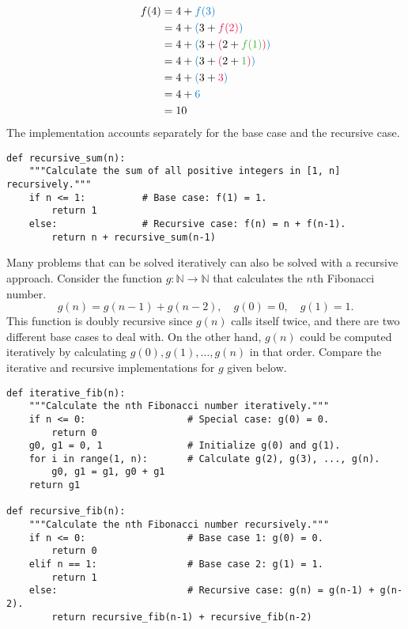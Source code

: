 \begin{align*}
f(4) &= 4 + \textcolor{blue}{f(3)}\\
     &= 4 + \textcolor{blue}{(}3 + \textcolor{red}{f(2)}\textcolor{blue}{)}\\
     &= 4 + \textcolor{blue}{(}3 + \textcolor{red}{(}2 + \textcolor{green}{f(1)}\textcolor{red}{)}\textcolor{blue}{)}\\
     &= 4 + \textcolor{blue}{(}3 + \textcolor{red}{(}2 + \textcolor{green}{1}\textcolor{red}{)}\textcolor{blue}{)} \\%
     &= 4 + \textcolor{blue}{(}3 + \textcolor{red}{3}\textcolor{blue}{)}\\
     &= 4 + \textcolor{blue}{6}\\
     &= 10
\end{align*}
The implementation accounts separately for the base case and the recursive case.



\begin{lstlisting}
def recursive_sum(n):
    """Calculate the sum of all positive integers in [1, n] recursively."""
    if n <= 1:          # Base case: f(1) = 1.
        return 1
    else:               # Recursive case: f(n) = n + f(n-1).
        return n + recursive_sum(n-1)
\end{lstlisting}

Many problems that can be solved iteratively can also be solved with a recursive approach.
Consider the function $g:\mathbb{N}\rightarrow\mathbb{N}$ that calculates the $n$th Fibonacci number.
\[
g(n) = g(n-1) + g(n-2),\quad g(0)=0,\quad g(1)=1.
\]
This function is doubly recursive since $g(n)$ calls itself twice, and there are two different base cases to deal with.
On the other hand, $g(n)$ could be computed iteratively by calculating  $g(0),g(1),\ldots,g(n)$ in that order.
Compare the iterative and recursive implementations for $g$ given below.

\begin{lstlisting}
def iterative_fib(n):
    """Calculate the nth Fibonacci number iteratively."""
    if n <= 0:                  # Special case: g(0) = 0.
        return 0
    g0, g1 = 0, 1               # Initialize g(0) and g(1).
    for i in range(1, n):       # Calculate g(2), g(3), ..., g(n).
        g0, g1 = g1, g0 + g1
    return g1

def recursive_fib(n):
    """Calculate the nth Fibonacci number recursively."""
    if n <= 0:                  # Base case 1: g(0) = 0.
        return 0
    elif n == 1:                # Base case 2: g(1) = 1.
        return 1
    else:                       # Recursive case: g(n) = g(n-1) + g(n-2).
        return recursive_fib(n-1) + recursive_fib(n-2)
\end{lstlisting}

